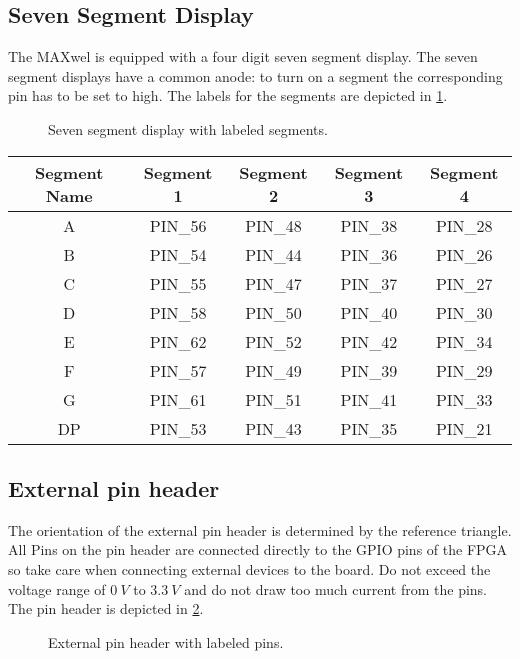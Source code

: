 \subsection{Seven Segment Display}
The MAXwel is equipped with a four digit seven segment display.
The seven segment displays have a common anode: to turn on a segment the corresponding pin has to be set to high.
The labels for the segments are depicted in \cref{fig:seven_segment_display}.

\begin{figure}[h!]
    \centering
    
    \caption{Seven segment display with labeled segments.}
    \label{fig:seven_segment_display}
\end{figure}

\begin{center}
	\begin{tabular}{c c c c c}
		Segment Name & Segment 1 & Segment 2 & Segment 3 & Segment 4 \\
		\hline
		A & PIN\_56 & PIN\_48 & PIN\_38 & PIN\_28 \\
		B & PIN\_54 & PIN\_44 & PIN\_36 & PIN\_26 \\
		C & PIN\_55 & PIN\_47 & PIN\_37 & PIN\_27 \\
		D & PIN\_58 & PIN\_50 & PIN\_40 & PIN\_30 \\
		E & PIN\_62 & PIN\_52 & PIN\_42 & PIN\_34 \\
		F & PIN\_57 & PIN\_49 & PIN\_39 & PIN\_29 \\
		G & PIN\_61 & PIN\_51 & PIN\_41 & PIN\_33 \\
		DP & PIN\_53 & PIN\_43 & PIN\_35 & PIN\_21 \\
		\hline
	\end{tabular}
\end{center}

\subsection{External pin header}
The orientation of the external pin header is determined by the reference triangle.
All Pins on the pin header are connected directly to the GPIO pins of the FPGA so take care when connecting external devices to the board.
Do not exceed the voltage range of $\SI{0}{V}$ to $\SI{3.3}{V}$ and do not draw too much current from the pins.
The pin header is depicted in \cref{fig:external_pin_header}.

\begin{figure}[h!]
    \centering
    
    \caption{External pin header with labeled pins.}
    \label{fig:external_pin_header}
\end{figure}

